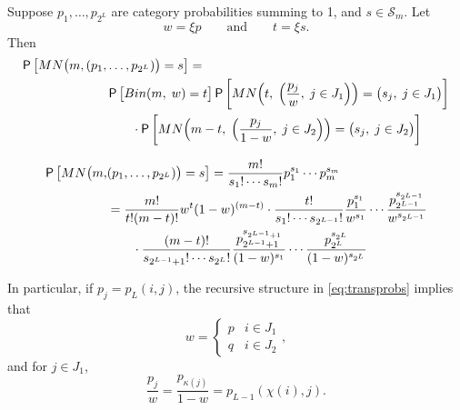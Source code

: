 \documentclass[11pt,draft]{article}
\newcommand{\Ssp}{\mathcal{S}}
\begin{document}
\begin{lem} \label{lem:mndecomp}
Suppose $p_1,\dots,p_{2^L}$ are category probabilities summing to 1, and 
$s\in\Ssp_m$.
Let
\[ w = \xi p
\qquad\text{and}\qquad
t = \xi s.
\]
Then
\begin{align*}
\P\big[MN\big(m, (p_1,&\dots,p_{2^L})\big) = s\big] = \\
&\P\big[Bin(m,\; w) = t \big]
\P\bigg[MN\Big(t,\; \Big(\frac{p_j}{w},\; j \in J_1\Big) \Big) =
\big(s_j,\; j \in J_1\big) \bigg]\\
&\qquad\cdot \P\bigg[MN\Big(m - t,\; \Big(\frac{p_j}{1 - w},\;
j \in J_2\Big) \Big) =
\big(s_j,\; j \in J_2\big) \bigg]\\
\end{align*}
\end{lem}
\begin{pf}
\begin{align*}
\P\big[MN\big(m,& (p_1,\dots,p_{2^L})\big) = s\big] =
\frac{m!}{s_1!\cdots s_m!} p_1^{s_1} \cdots p_m^{s_m} \\
&= \frac{m!}{t! (m-t)!}w^t (1-w)^{(m-t)} \cdot \frac{t!}{s_1!\cdots s_{2^{L-1}}!}
\frac{p_1^{s_1}}{w^{s_1}}\cdots
\frac{p_{2^{L-1}}^{s_{2^{L-1}}}}{w^{s_{2^{L-1}}}} \\
&\qquad\cdot\frac{(m-t)!}{s_{2^{L-1}+1}!\cdots s_{2^L}!}
\frac{p_{2^{L-1} + 1}^{s_{2^{L-1} + 1}}}{(1-w)^{s_1}}\cdots
\frac{p_{2^L}^{s_{2^L}}}{(1-w)^{s_{2^L}}}
\end{align*}
\end{pf}

In particular, if $p_j = p_L(i, j)$, the recursive structure in
\eqref{eq:transprobs} implies that
\[ w = \begin{cases} p & i \in J_1 \\  q & i \in J_2 \end{cases}, \]
and for $j \in J_1$,
\[ \frac{p_j}{w} = \frac{p_{\kappa(j)}}{1-w} = p_{L-1}(\chi(i), j).
\]
\end{document}

